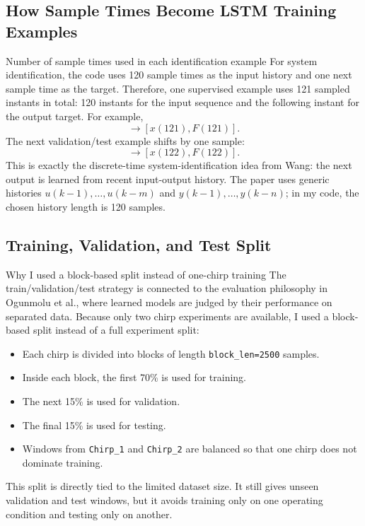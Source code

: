 \documentclass[11pt]{article}
\begin{document}
\subsection{How Sample Times Become LSTM Training Examples}
\begin{datadecisionbox}{Number of sample times used in each identification example}
For system identification, the code uses 120 sample times as the input history and one next sample time as the target. Therefore, one supervised example uses 121 sampled instants in total: 120 instants for the input sequence and the following instant for the output target. For example,
\begin{equation}
[I(1:120),x(1:120),F(1:120)] \rightarrow [x(121),F(121)].
\end{equation}
The next validation/test example shifts by one sample:
\begin{equation}
[I(2:121),x(2:121),F(2:121)] \rightarrow [x(122),F(122)].
\end{equation}
This is exactly the discrete-time system-identification idea from Wang: the next output is learned from recent input-output history. The paper uses generic histories $u(k-1),\ldots,u(k-m)$ and $y(k-1),\ldots,y(k-n)$; in my code, the chosen history length is 120 samples.
\end{datadecisionbox}

\subsection{Training, Validation, and Test Split}
\begin{datadecisionbox}{Why I used a block-based split instead of one-chirp training}
The train/validation/test strategy is connected to the evaluation philosophy in Ogunmolu et al., where learned models are judged by their performance on separated data. Because only two chirp experiments are available, I used a block-based split instead of a full experiment split:
\begin{itemize}[leftmargin=1.5em]
    \item Each chirp is divided into blocks of length \texttt{block\_len=2500} samples.
    \item Inside each block, the first 70\% is used for training.
    \item The next 15\% is used for validation.
    \item The final 15\% is used for testing.
    \item Windows from \texttt{Chirp\_1} and \texttt{Chirp\_2} are balanced so that one chirp does not dominate training.
\end{itemize}
This split is directly tied to the limited dataset size. It still gives unseen validation and test windows, but it avoids training only on one operating condition and testing only on another.
\end{datadecisionbox}
\end{document}
